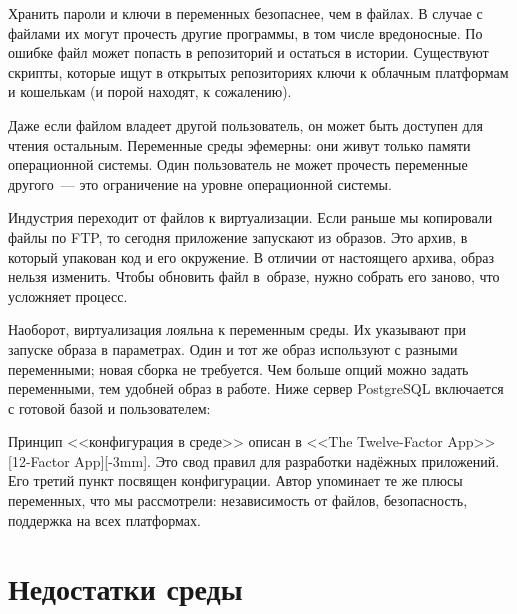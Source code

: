 \label{password-note}


Хранить пароли и ключи в переменных безопаснее, чем в файлах. В случае с файлами
их могут прочесть другие программы, в том числе вредоносные. По ошибке файл
может попасть в репозиторий и остаться в истории. Существуют скрипты, которые
ищут в открытых репозиториях ключи к облачным платформам и кошелькам (и порой
находят, к сожалению).

Даже если файлом владеет другой пользователь, он может быть доступен для чтения
остальным. Переменные среды эфемерны: они живут только памяти операционной
системы. Один пользователь не может прочесть переменные другого~--- это
ограничение на уровне операционной системы.


Индустрия переходит от файлов к виртуализации. Если раньше мы копировали файлы
по FTP, то сегодня приложение запускают из образов. Это архив, в который
упакован код и его окружение. В отличии от настоящего архива, образ нельзя
изменить. Чтобы обновить файл в~образе, нужно собрать его заново, что усложняет
процесс.


Наоборот, виртуализация лояльна к переменным среды. Их указывают при запуске
образа в параметрах. Один и тот же образ используют с разными переменными; новая
сборка не требуется. Чем больше опций можно задать переменными, тем удобней
образ в работе. Ниже сервер PostgreSQL включается с готовой базой и
пользователем:

\begin{english}
\end{english}


Принцип <<конфигурация в среде>> описан в <<The Twelve-Factor App>>[12-Factor App][-3mm].
Это свод правил для разработки надёжных приложений. Его третий пункт посвящен конфигурации.
Автор упоминает те же плюсы переменных, что мы рассмотрели: независимость от файлов,
безопасность, поддержка на всех платформах.

\section{Недостатки среды}

